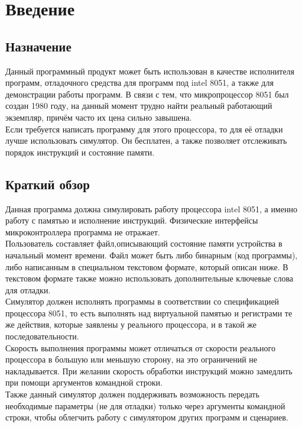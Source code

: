 





\large



\setcounter{page}{2}

\tableofcontents
\newpage


\section{Введение}
\subsection{Назначение}
Данный программный продукт может быть использован в качестве исполнителя программ, отладочного средства для программ под intel 8051, а также для демонстрации работы программ. В связи с тем, что микропроцессор 8051 был создан 1980 году, на данный момент трудно найти реальный работающий экземпляр, причём часто их цена сильно завышена.\\
Если требуется написать программу для этого процессора, то для её отладки лучше использовать симулятор. Он бесплатен, а также позволяет отслеживать порядок инструкций и состояние памяти.\\
\subsection{Краткий обзор}
Данная программа должна симулировать работу процессора intel 8051, а именно работу с памятью и исполнение инструкций. Физические интерфейсы микроконтроллера программа не отражает.\\
Пользователь составляет файл,описывающий состояние памяти устройства в начальный момент времени. Файл может быть либо бинарным (код программы), либо написанным в специальном текстовом формате, который описан ниже. В текстовом формате также можно использовать дополнительные ключевые слова для отладки.\\
Симулятор должен исполнять программы в соответствии со спецификацией процессора 8051, то есть выполнять над виртуальной памятью и регистрами те же действия, которые заявлены у реального процессора, и в такой же последовательности. \\
Скорость выполнения программы может отличаться от скорости реального процессора в большую или меньшую сторону, на это ограничений не накладывается.
При желании скорость обработки инструкций можно замедлить при помощи аргументов командной строки. \\
Также данный симулятор должен поддерживать возможность передать необходимые параметры (не для отладки) только через аргументы командной строки, чтобы облегчить работу с симулятором других программ и сценариев.
